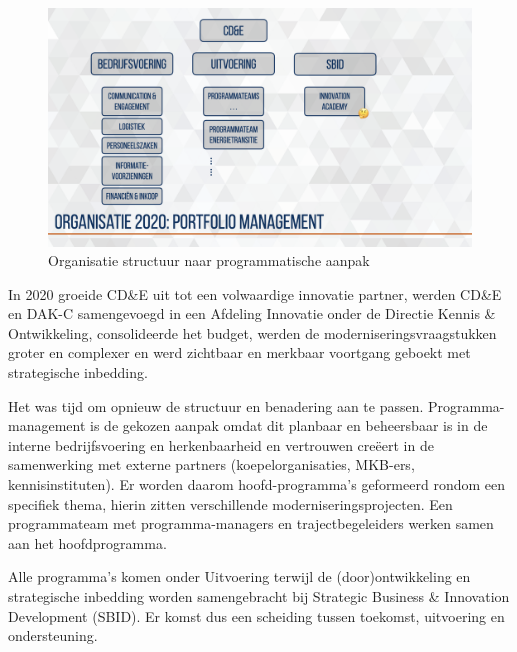 \documentclass[
]{book}
\begin{document}
\begin{figure}

{\centering \includegraphics[width=0.5\linewidth]{data/keynote-slides/20200430-CDE-Designprocess/20200430-CDE-Designprocess.009-4} 

}

\caption{Organisatie structuur naar programmatische aanpak }\label{fig:unnamed-chunk-28}
\end{figure}

In 2020 groeide CD\&E uit tot een volwaardige innovatie partner, werden CD\&E en DAK-C samengevoegd in een Afdeling Innovatie onder de Directie Kennis \& Ontwikkeling, consolideerde het budget, werden de moderniseringsvraagstukken groter en complexer en werd zichtbaar en merkbaar voortgang geboekt met strategische inbedding.

Het was tijd om opnieuw de structuur en benadering aan te passen. Programma-management is de gekozen aanpak omdat dit planbaar en beheersbaar is in de interne bedrijfsvoering en herkenbaarheid en vertrouwen creëert in de samenwerking met externe partners (koepelorganisaties, MKB-ers, kennisinstituten). Er worden daarom hoofd-programma's geformeerd rondom een specifiek thema, hierin zitten verschillende moderniseringsprojecten. Een programmateam met programma-managers en trajectbegeleiders werken samen aan het hoofdprogramma.

Alle programma's komen onder Uitvoering terwijl de (door)ontwikkeling en strategische inbedding worden samengebracht bij Strategic Business \& Innovation Development (SBID). Er komst dus een scheiding tussen toekomst, uitvoering en ondersteuning.
\end{document}
